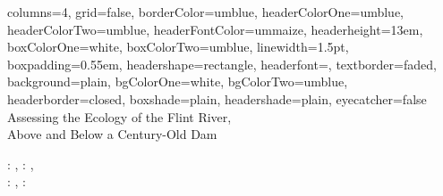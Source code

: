 \documentclass[kappa, margin=1cm, fontscale=0.28]{baposter}
\begin{document}

\begin{poster}{
    columns=4,
    grid=false,
    borderColor=umblue,
    headerColorOne=umblue,
    headerColorTwo=umblue,
    headerFontColor=ummaize,
    headerheight=13em,
    boxColorOne=white,
    boxColorTwo=umblue,
    linewidth=1.5pt,
    boxpadding=0.55em,
    headershape=rectangle,
    headerfont=\Large\textsf,
    textborder=faded,
    background=plain,
    bgColorOne=white,
    bgColorTwo=umblue,
    headerborder=closed,
    boxshade=plain,
    headershade=plain,
    eyecatcher=false
}
{
}
{Assessing the Ecology of the Flint River, \\ Above and Below a Century-Old Dam}
{
  \vspace{0mm}
   : \textit{\color{violet}{summersj@umich.edu}}, 
   : \textit{\color{violet}{arelkins@umich.edu}}, \\
   : \textit{\color{violet}{casonk@umich.edu}}, 
   : \textit{\color{violet}{hdawson@umich.edu}} 
  
}
\end{poster}
\end{document}
